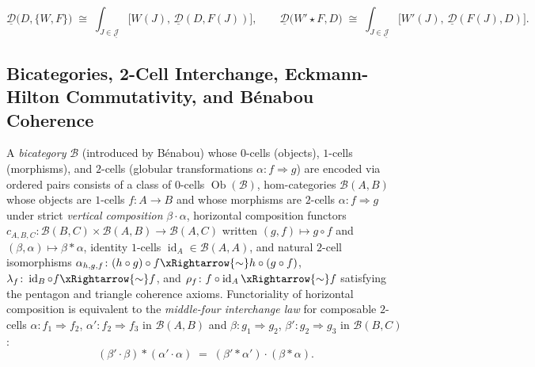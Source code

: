 \[
\underline{\mathcal{D}}\bigl(D, \{W, F\}\bigr) \;\cong\; \int_{J \in \underline{\mathcal{J}}} \bigl[W(J),\, \underline{\mathcal{D}}(D, F(J))\bigr], \qquad \underline{\mathcal{D}}\bigl(W' \star F, D\bigr) \;\cong\; \int_{J \in \underline{\mathcal{J}}} \bigl[W'(J),\, \underline{\mathcal{D}}(F(J), D)\bigr].
\]

\subsection{Bicategories, 2-Cell Interchange, Eckmann-Hilton Commutativity, and B\'enabou Coherence}
\label{subsec:bicategories_interchange_eckmann_hilton_benabou}

A \emph{bicategory} $\mathcal{B}$ (introduced by B\'enabou) whose $0$-cells (objects), $1$-cells (morphisms), and $2$-cells (globular transformations $\alpha\colon f \Rightarrow g$) are encoded via ordered pairs consists of a class of $0$-cells $\operatorname{Ob}(\mathcal{B})$, hom-categories $\mathcal{B}(A, B)$ whose objects are $1$-cells $f\colon A \to B$ and whose morphisms are $2$-cells $\alpha\colon f \Rightarrow g$ under strict \emph{vertical composition} $\beta \cdot \alpha$, horizontal composition functors $c_{A,B,C}\colon \mathcal{B}(B, C) \times \mathcal{B}(A, B) \to \mathcal{B}(A, C)$ written $(g, f) \mapsto g \circ f$ and $(\beta, \alpha) \mapsto \beta \ast \alpha$, identity $1$-cells $\operatorname{id}_A \in \mathcal{B}(A, A)$, and natural $2$-cell isomorphisms $\alpha_{h,g,f}\colon (h \circ g) \circ f \xRightarrow{\sim} h \circ (g \circ f)$, $\lambda_f\colon \operatorname{id}_B \circ f \xRightarrow{\sim} f$, and $\rho_f\colon f \circ \operatorname{id}_A \xRightarrow{\sim} f$ satisfying the pentagon and triangle coherence axioms. Functoriality of horizontal composition is equivalent to the \emph{middle-four interchange law} for composable $2$-cells $\alpha\colon f_1 \Rightarrow f_2$, $\alpha'\colon f_2 \Rightarrow f_3$ in $\mathcal{B}(A, B)$ and $\beta\colon g_1 \Rightarrow g_2$, $\beta'\colon g_2 \Rightarrow g_3$ in $\mathcal{B}(B, C)$:
\[
(\beta' \cdot \beta) \ast (\alpha' \cdot \alpha) \;=\; (\beta' \ast \alpha') \cdot (\beta \ast \alpha).
\]
